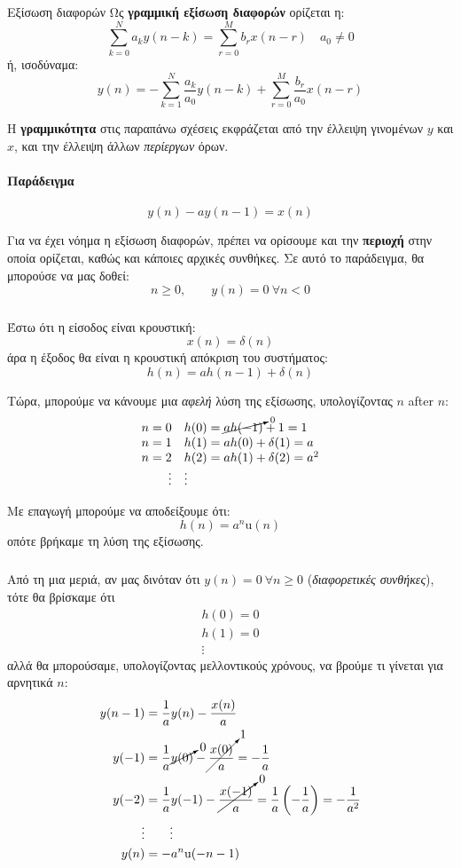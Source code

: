 \documentclass[11pt,a4paper,notitlepage,fleqn,draft]{article}
\begin{document}
\begin{defn}{Εξίσωση διαφορών}{}
	Ως \textbf{γραμμική εξίσωση διαφορών} ορίζεται η:
	\[
	\sum_{k=0}^{N} a_k y(n-k) = \sum_{r=0}^{M} b_r x(n-r)\quad a_0 \neq 0
	\]
	ή, ισοδύναμα:
	\[
	y(n) = -\sum_{k=1}^{N} \frac{a_k}{a_0} y(n-k) + \sum_{r=0}^{M} \frac{b_r}{a_0} x(n-r)
	\]
\end{defn}

Η \textbf{γραμμικότητα} στις παραπάνω σχέσεις εκφράζεται από την έλλειψη γινομένων \( y \) και \( x \),
και την έλλειψη άλλων \emph{περίεργων} όρων.

\paragraph{Παράδειγμα}
\[
y(n) - ay(n-1) = x(n)
\]

Για να έχει νόημα η εξίσωση διαφορών, πρέπει να ορίσουμε και την \textbf{περιοχή} στην οποία
ορίζεται, καθώς και κάποιες αρχικές συνθήκες. Σε αυτό το παράδειγμα, θα μπορούσε να μας δοθεί:
\[
n \geq 0, \qquad y(n) = 0 \ \forall n < 0
\]

\subparagraph{}
Έστω ότι η είσοδος είναι κρουστική: \[
x(n) = \delta(n)
\]
άρα η έξοδος θα είναι η κρουστική απόκριση του συστήματος:
\[
h(n) = ah(n-1) + \delta(n)
\]

Τώρα, μπορούμε να κάνουμε μια \emph{αφελή} λύση της εξίσωσης, υπολογίζοντας \( n \) after \( n \):
\[
\begin{array}{rl}
n=0 & h(0) = \cancelto{0}{ah(-1)}+1 = 1\\
n=1 & h(1) = ah(0) + \delta(1) = a\\
n=2 & h(2) = ah(1) + \delta(2) = a^2\\
\vdots & \vdots 
\end{array}
\]

Με επαγωγή μπορούμε να αποδείξουμε ότι:
\[
h(n) = a^n \mathrm{u}(n)
\]
οπότε βρήκαμε τη λύση της εξίσωσης.

\subparagraph{}
Από τη μια μεριά, αν μας δινόταν ότι \( y(n) = 0\ \forall n \geq 0 \) (\emph{διαφορετικές συνθήκες}), τότε θα βρίσκαμε ότι
\begin{gather*}
	h(0) = 0\\h(1) = 0 \\ \vdots
\end{gather*}
αλλά θα μπορούσαμε, υπολογίζοντας μελλοντικούς χρόνους, να βρούμε τι γίνεται για αρνητικά \( n \):
\begin{align*}
	y(n-1) &= \frac{1}{a}y(n) - \frac{x(n)}{a}\\
	y(-1) &= \frac{1}{a}\cancelto{0}{y(0)} - \cancelto{1}{\frac{x(0)}{a}} = -\frac{1}{a}\\
	y(-2) &= \frac{1}{a}y(-1) - \cancelto{0}{\frac{x(-1)}{a}} = \frac{1}{a}\left(-\frac{1}{a}\right)=-\frac{1}{a^2} \\
	\vdots & \qquad \vdots \\
	y(n) &= -a^n\mathrm u(-n-1)
\end{align*}
\end{document}
